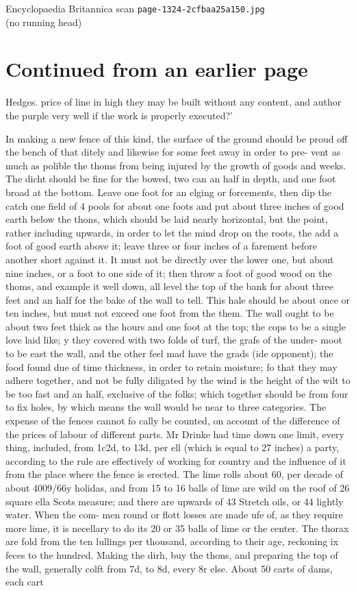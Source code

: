 \documentclass{article}
\begin{document}
\begin{center}
{\Large Encyclopaedia Britannica scan \texttt{page-1324-2cfbaa25a150.jpg}}\\[0.5em]
(no running head)
\end{center}
\section*{Continued from an earlier page}
Hedges. price of line in high they may be built without any content, and author the purple very well if the work is properly executed?’

In making a new fence of this kind, the surface of the ground should be proud off the bench of that ditely and likewise for some feet away in order to pre- vent as much as polible the thoms from being injured by the growth of goods and weeks. The dicht should be fine for the bowed, two can an half in depth, and one foot broad at the bottom. Leave one foot for an elging or forcements, then dip the catch one field of 4 pools for about one foots and put about three inches of good earth below the thons, which should be laid nearly horizontal, but the point, rather including upwards, in order to let the mind drop on the roots, the add a foot of good earth above it; leave three or four inches of a farement before another short against it. It must not be directly over the lower one, but about nine inches, or a foot to one side of it; then throw a foot of good wood on the thoms, and example it well down, all level the top of the bank for about three feet and an half for the bake of the wall to tell. This hale should be about once or ten inches, but must not exceed one foot from the them. The wall ought to be about two feet thick as the hours and one foot at the top; the cops to be a single love laid like; y they covered with two folds of turf, the grafs of the under- moot to be east the wall, and the other feel mad have the grads (ide opponent); the food found due of time thickness, in order to retain moisture; fo that they may adhere together, and not be fully diligated by the wind is the height of the wilt to be too fast and an half, exclusive of the folks; which together should be from four to fix holes, by which means the wall would be near to three categories. The expense of the fences cannot fo cally be counted, on account of the difference of the prices of labour of different parts. Mr Drinke had time down one limit, every thing, included, from 1c2d, to 13d, per ell (which is equal to 27 inches) a party, according to the rule are effectively of working for country and the influence of it from the place where the fence is erected. The lime rolls about 60, per decade of about 4009/66y holidas, and from 15 to 16 balls of lime are wild on the roof of 26 square ella Scots measure; and there are upwards of 43 Stretch oils, or 44 lightly water. When the com- men round or flott losses are made ufe of, as they require more lime, it is necellary to do its 20 or 35 balls of lime or the center. The thorax are fold from the ten lullings per thousand, according to their age, reckoning ix feces to the hundred. Making the dirh, buy the thons, and preparing the top of the wall, generally colft from 7d, to 8d, every 8r else. About 50 carts of dams, each cart 
\end{document}

